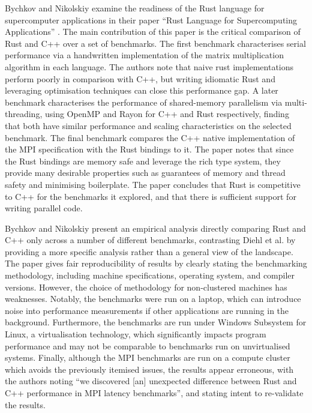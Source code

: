 Bychkov and Nikolskiy examine the readiness of the Rust language for supercomputer applications in their paper ``Rust Language for Supercomputing Applications'' \cite{bychkovRustLanguageSupercomputing2021}. The main contribution of this paper is the critical comparison of Rust and C++ over a set of benchmarks. The first benchmark characterises serial performance via a handwritten implementation of the matrix multiplication algorithm in each language. The authors note that naive rust implementations perform poorly in comparison with C++, but writing idiomatic Rust and leveraging optimisation techniques can close this performance gap. A later benchmark characterises the performance of shared-memory parallelism via multi-threading, using OpenMP and Rayon for C++ and Rust respectively, finding that both have similar performance and scaling characteristics on the selected benchmark. The final benchmark compares the C++ native implementation of the MPI specification with the Rust bindings to it. The paper notes that since the Rust bindings are memory safe and leverage the rich type system, they provide many desirable properties such as guarantees of memory and thread safety and minimising boilerplate. The paper concludes that Rust is competitive to C++ for the benchmarks it explored, and that there is sufficient support for writing parallel code.

Bychkov and Nikolskiy present an empirical analysis directly comparing Rust and C++ only across a number of different benchmarks, contrasting Diehl et al. by providing a more specific analysis rather than a general view of the landscape. The paper gives fair reproducibility of results by clearly stating the benchmarking methodology, including machine specifications, operating system, and compiler versions. However, the choice of methodology for non-clustered machines has weaknesses. Notably, the benchmarks were run on a laptop, which can introduce noise into performance measurements if other applications are running in the background. Furthermore, the benchmarks are run under Windows Subsystem for Linux, a virtualisation technology, which significantly impacts program performance and may not be comparable to benchmarks run on unvirtualised systems. Finally, although the MPI benchmarks are run on a compute cluster which avoids the previously itemised issues, the results appear erroneous, with the authors noting ``we discovered [an] unexpected difference between Rust and C++ performance in MPI latency benchmarks'', and stating intent to re-validate the results.


